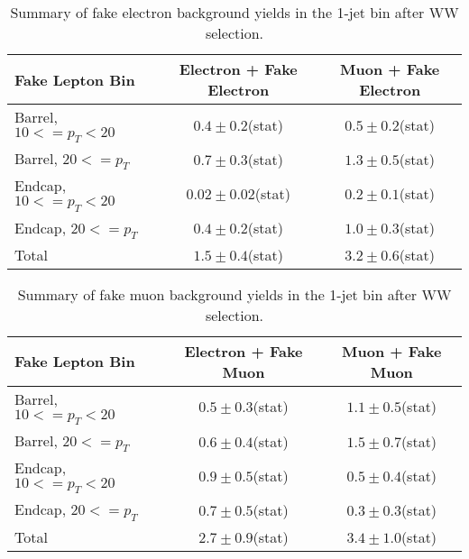 \begin{table}[!htbp]
\begin{center}
\begin{tabular}{|l|c|c|}
\hline
Fake Lepton Bin               & Electron + Fake Electron & Muon + Fake Electron  \\
\hline
Barrel, $10 <= p_{T} < 20$    &  $0.4 \pm 0.2$(stat)     &   $0.5 \pm 0.2$(stat) \\
Barrel, $20 <= p_{T} $        &  $0.7 \pm 0.3$(stat)     &   $1.3 \pm 0.5$(stat) \\
Endcap, $10 <= p_{T} < 20$    &  $0.02 \pm 0.02$(stat)   &   $0.2 \pm 0.1$(stat) \\
Endcap, $20 <= p_{T} $        &  $0.4 \pm 0.2$(stat)     &   $1.0 \pm 0.3$(stat) \\
\hline
Total                         &  $1.5  \pm 0.4$(stat)    &   $3.2 \pm 0.6$(stat) \\
\hline
\end{tabular}
\caption{Summary of fake electron background yields in the 1-jet bin after WW selection. }
\label{tab:FakeElectronBkgPrediction_WWSelection_1JetBin}
\end{center}
\end{table}


\begin{table}[!htbp]
\begin{center}
\begin{tabular}{|l|c|c|}
\hline
Fake Lepton Bin               & Electron + Fake Muon & Muon + Fake Muon  \\
\hline
Barrel, $10 <= p_{T} < 20$    &  $0.5 \pm 0.3$(stat)     &   $1.1 \pm 0.5$(stat) \\
Barrel, $20 <= p_{T} $        &  $0.6 \pm 0.4$(stat)     &   $1.5 \pm 0.7$(stat) \\
Endcap, $10 <= p_{T} < 20$    &  $0.9 \pm 0.5$(stat)     &   $0.5 \pm 0.4$(stat) \\
Endcap, $20 <= p_{T} $        &  $0.7 \pm 0.5$(stat)     &   $0.3 \pm 0.3$(stat) \\
\hline
Total                         &  $2.7 \pm 0.9$(stat)     &   $3.4 \pm 1.0$(stat) \\
\hline
\end{tabular}
\caption{Summary of fake muon background yields in the 1-jet bin after WW selection. }
\label{tab:FakeElectronBkgPrediction_WWSelection_1JetBin}
\end{center}
\end{table}





